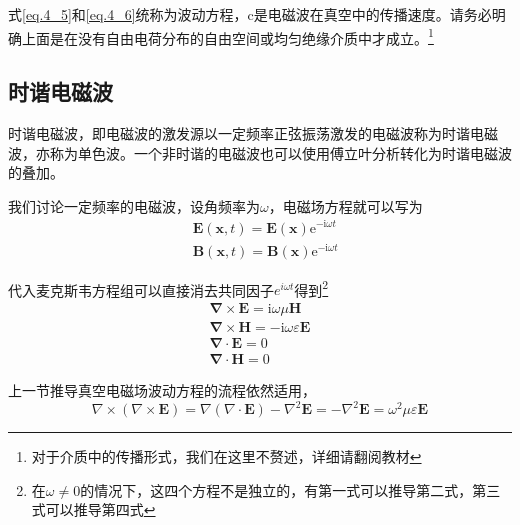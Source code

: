         式\ref{eq.4_5}和\ref{eq.4_6}统称为波动方程，c是电磁波在真空中的传播速度。请务必明确上面是在没有自由电荷分布的自由空间或均匀绝缘介质中才成立。\footnote{对于介质中的传播形式，我们在这里不赘述，详细请翻阅教材}
    \subsection{时谐电磁波}
        时谐电磁波，即电磁波的激发源以一定频率正弦振荡激发的电磁波称为时谐电磁波，亦称为单色波。一个非时谐的电磁波也可以使用傅立叶分析转化为时谐电磁波的叠加。

        我们讨论一定频率的电磁波，设角频率为$\omega$，电磁场方程就可以写为
        \begin{equation}
            \begin{aligned}
            &\boldsymbol{E}(\boldsymbol{x}, t)=\boldsymbol{E}(\boldsymbol{x}) \mathrm{e}^{-\mathrm{i} \omega t} \\
            &\boldsymbol{B}(\boldsymbol{x}, t)=\boldsymbol{B}(\boldsymbol{x}) \mathrm{e}^{-\mathrm{i} \omega t}
            \end{aligned}
        \end{equation}

        代入麦克斯韦方程组可以直接消去共同因子$e^{i \omega t}$得到\footnote{在$\omega \neq 0$的情况下，这四个方程不是独立的，有第一式可以推导第二式，第三式可以推导第四式}
        \begin{equation}
            \begin{gathered}
            \boldsymbol{\nabla} \times \boldsymbol{E}=\mathrm{i} \omega \mu \boldsymbol{H} \\
            \boldsymbol{\nabla} \times \boldsymbol{H}=-\mathrm{i} \omega \varepsilon \boldsymbol{E} \\
            \boldsymbol{\nabla} \cdot \boldsymbol{E}=0 \\
            \boldsymbol{\nabla} \cdot \mathbf{H}=0
            \end{gathered}
            \end{equation}
        
        上一节推导真空电磁场波动方程的流程依然适用，
        \begin{equation}
            \boxed{\nabla \times (\nabla \times \boldsymbol{E}) = \nabla(\nabla \cdot \boldsymbol{E})-\nabla^2 \boldsymbol{E}=-\nabla^2 \boldsymbol{E} = \omega^2 \mu \varepsilon \boldsymbol{E}}
        \end{equation}
        
